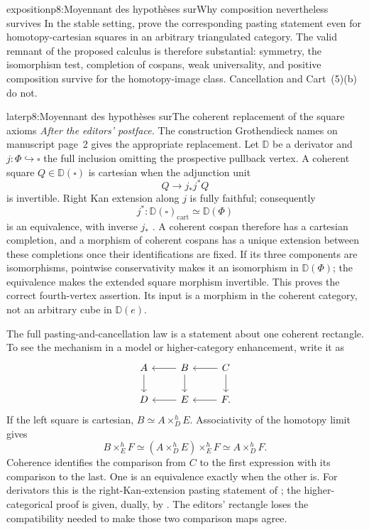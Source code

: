 \begin{dcomment}{exposition}{p8:Moyennant des hypothèses sur}{Why composition nevertheless survives}
In the stable setting, \citet[Proposition~6.11, pp.~17--18 of the 7~June~2021 author version]{ChristensenFrankland2022} prove the corresponding pasting statement even for homotopy-cartesian squares in an arbitrary triangulated category. The valid remnant of the proposed calculus is therefore substantial: symmetry, the isomorphism test, completion of cospans, weak universality, and positive composition survive for the homotopy-image class. Cancellation and Cart~(5)(b) do not.
\end{dcomment}

\begin{dcomment}{later}{p8:Moyennant des hypothèses sur}{The coherent replacement of the square axioms}
\emph{After the editors' postface.}
The construction Grothendieck names on manuscript page~2 gives the appropriate replacement. Let $\mathbb D$ be a derivator and $j:\Phi\hookrightarrow\square$ the full inclusion omitting the prospective pullback vertex. A coherent square $Q\in\mathbb D(\square)$ is cartesian when the adjunction unit
\[
 Q\longrightarrow j_*j^*Q
\]
is invertible. Right Kan extension along $j$ is fully faithful; consequently
\[
 j^*:\mathbb D(\square)_{\mathrm{cart}}
       \simeq\mathbb D(\Phi)
\]
is an equivalence, with inverse $j_*$ \citep[Proposition~1.20 and Definition~3.9]{Groth2013}. A coherent cospan therefore has a cartesian completion, and a morphism of coherent cospans has a unique extension between these completions once their identifications are fixed. If its three components are isomorphisms, pointwise conservativity makes it an isomorphism in $\mathbb D(\Phi)$; the equivalence makes the extended square morphism invertible. This proves the correct fourth-vertex assertion. Its input is a morphism in the coherent category, not an arbitrary cube in $\mathbb D(e)$.

The full pasting-and-cancellation law is a statement about one coherent rectangle. To see the mechanism in a model or higher-category enhancement, write it as
\[
\begin{tikzcd}
A\ar[d]&B\ar[l]\ar[d]&C\ar[l]\ar[d]\\
D&E\ar[l]&F\ar[l].
\end{tikzcd}
\]
If the left square is cartesian, $B\simeq A\times^h_D E$. Associativity of the homotopy limit gives
\[
 B\times^h_E F\simeq
 (A\times^h_D E)\times^h_E F\simeq A\times^h_D F.
\]
Coherence identifies the comparison from $C$ to the first expression with its comparison to the last. One is an equivalence exactly when the other is. For derivators this is the right-Kan-extension pasting statement of \citet[Proposition~3.13]{Groth2013}; the higher-categorical proof is given, dually, by \citet[Lemma~4.4.2.1]{Lurie2009HTT}. The editors' rectangle loses the compatibility needed to make those two comparison maps agree.


\end{dcomment}
